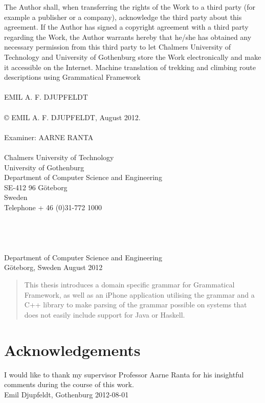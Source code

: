 The Author shall, when transferring the rights of the Work to a third party (for example a publisher or a company), acknowledge the third party about this agreement. If the Author has signed a copyright agreement with a third party regarding the Work, the Author warrants hereby that he/she has obtained any necessary permission from this third party to let Chalmers University of Technology and University of Gothenburg  store the Work electronically and make it accessible on the Internet.
\vfill
Machine translation of trekking and climbing route descriptions using Grammatical Framework\\
\\
EMIL A. F. DJUPFELDT\\
\\
© EMIL A. F. DJUPFELDT, August 2012.\\
\\
Examiner: AARNE RANTA\\
\\
Chalmers University of Technology\\
University of Gothenburg\\
Department of Computer Science and Engineering\\
SE-412 96 Göteborg\\
Sweden\\
Telephone + 46 (0)31-772 1000\\
\\
\\
\\
\\
Department of Computer Science and Engineering\\
Göteborg, Sweden August 2012

\newpage
\clearpage
\thispagestyle{empty}

\begin{abstract}
This thesis introduces a domain specific grammar for Grammatical Framework, as well as an iPhone application utilising the grammar and a C++ library to make parsing of the grammar possible on systems that does not easily include support for Java or Haskell.
\end{abstract}

\newpage
\clearpage
\mbox{}
\newpage
\clearpage
\thispagestyle{empty}
\section*{Acknowledgements}
I would like to thank my supervisor Professor Aarne Ranta for his insightful comments during the course of this work.\\[1cm]

\hfill Emil Djupfeldt, Gothenburg 2012-08-01
\newpage
\clearpage
\mbox{}
